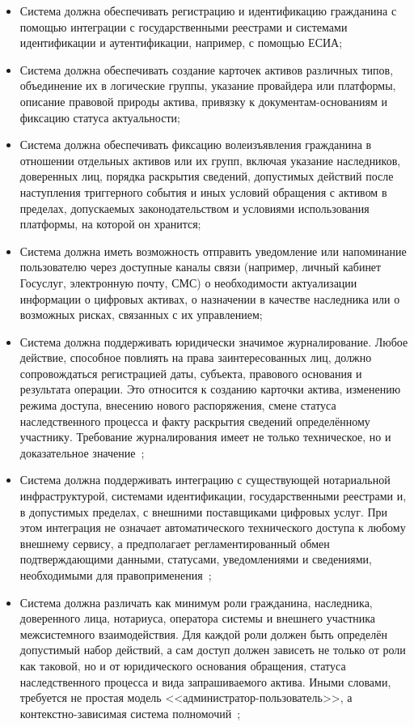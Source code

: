 \begin{itemize}
  \item Система должна обеспечивать регистрацию и идентификацию гражданина с помощью интеграции с государственными реестрами и системами идентификации и аутентификации, например, с помощью ЕСИА;
  \item Система должна обеспечивать создание карточек активов различных типов, объединение их в логические группы, указание провайдера или платформы, описание правовой природы актива, привязку к документам-основаниям и фиксацию статуса актуальности;
  \item Система должна обеспечивать фиксацию волеизъявления гражданина в отношении отдельных активов или их групп, включая указание наследников, доверенных лиц, порядка раскрытия сведений, допустимых действий после наступления триггерного события и иных условий обращения с активом в пределах, допускаемых законодательством и условиями использования платформы, на которой он хранится;
  \item Система должна иметь возможность отправить уведомление или напоминание пользователю через доступные каналы связи (например, личный кабинет Госуслуг, электронную почту, СМС) о необходимости актуализации информации о цифровых активах, о назначении в качестве наследника или о возможных рисках, связанных с их управлением;
  \item Система должна поддерживать юридически значимое журналирование. Любое действие, способное повлиять на права заинтересованных лиц, должно сопровождаться регистрацией даты, субъекта, правового основания и результата операции. Это относится к созданию карточки актива, изменению режима доступа, внесению нового распоряжения, смене статуса наследственного процесса и факту раскрытия сведений определённому участнику. Требование журналирования имеет не только техническое, но и доказательное значение~\cite{iso14721_2025, iso16363_2025, nist80053r5_2020};
  \item Система должна поддерживать интеграцию с существующей нотариальной инфраструктурой, системами идентификации, государственными реестрами и, в допустимых пределах, с внешними поставщиками цифровых услуг. При этом интеграция не означает автоматического технического доступа к любому внешнему сервису, а предполагает регламентированный обмен подтверждающими данными, статусами, уведомлениями и сведениями, необходимыми для правоприменения~\cite{Haritonova2024HSE};
  \item Система должна различать как минимум роли гражданина, наследника, доверенного лица, нотариуса, оператора системы и внешнего участника межсистемного взаимодействия. Для каждой роли должен быть определён допустимый набор действий, а сам доступ должен зависеть не только от роли как таковой, но и от юридического основания обращения, статуса наследственного процесса и вида запрашиваемого актива. Иными словами, требуется не простая модель <<администратор-пользователь>>, а контекстно-зависимая система полномочий~\cite{nist80063_4_2025, nist80053r5_2020};

\end{itemize}
